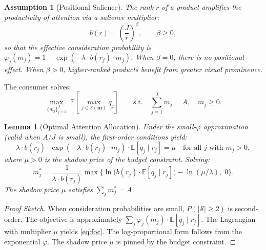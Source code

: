 \documentclass[12pt]{article}
\newtheorem{assumption}{Assumption}
\newtheorem{lemma}{Lemma}
\begin{document}
\begin{assumption}[Positional Salience]\label{a:salience}
The rank $r$ of a product amplifies the productivity of attention via a salience multiplier:
\begin{equation}\label{eq:salience}
    b(r) = \left(\frac{J}{r}\right)^{\!\beta}, \qquad \beta \geq 0,
\end{equation}
so that the effective consideration probability is $\varphi_j(m_j) = 1 - \exp(-\lambda \cdot b(r_j) \cdot m_j)$. When $\beta = 0$, there is no positional effect. When $\beta > 0$, higher-ranked products benefit from greater visual prominence.
\end{assumption}

The consumer solves:
\begin{equation}\label{eq:consumer_problem_full}
    \max_{\{m_j\}_{j=1}^{J}} \; \mathbb{E}\!\left[\max_{j \in \mathcal{S}(\mathbf{m})} q_j\right] \qquad \text{s.t.} \quad \sum_{j=1}^{J} m_j = A, \quad m_j \geq 0.
\end{equation}

\begin{lemma}[Optimal Attention Allocation]\label{lem:attention}
Under the small-$\varphi$ approximation (valid when $A/J$ is small), the first-order conditions yield:
\begin{equation}\label{eq:foc}
    \lambda \cdot b(r_j) \cdot \exp(-\lambda \cdot b(r_j) \cdot m_j) \cdot \mathbb{E}[q_j \mid r_j] = \mu \quad \text{for all } j \text{ with } m_j > 0,
\end{equation}
where $\mu > 0$ is the shadow price of the budget constraint. Solving:
\begin{equation}\label{eq:optimal_attention}
    m_j^* = \frac{1}{\lambda \cdot b(r_j)} \max\!\Big\{\ln\!\big(b(r_j) \cdot \mathbb{E}[q_j \mid r_j]\big) - \ln(\mu / \lambda),\; 0\Big\}.
\end{equation}
The shadow price $\mu$ satisfies $\sum_j m_j^* = A$.
\end{lemma}

\begin{proof}[Proof Sketch]
When consideration probabilities are small, $P(|\mathcal{S}| \geq 2)$ is second-order. The objective is approximately $\sum_j \varphi_j(m_j) \cdot \mathbb{E}[q_j \mid r_j]$. The Lagrangian with multiplier $\mu$ yields \eqref{eq:foc}. The log-proportional form follows from the exponential $\varphi$. The shadow price $\mu$ is pinned by the budget constraint.
\end{proof}
\end{document}
